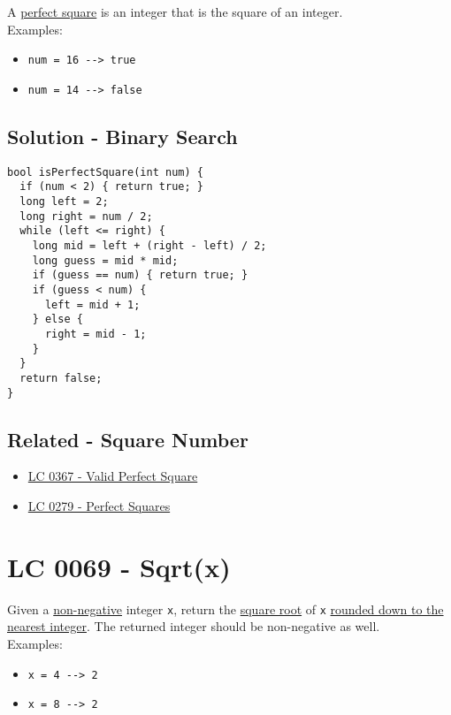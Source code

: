 A \ul{perfect square} is an integer that is the square of an integer.\\

Examples:
\begin{itemize}
\item {\colorbox{CodeBackground}{\lstinline|num = 16 --> true|}}
\item {\colorbox{CodeBackground}{\lstinline|num = 14 --> false|}}
\end{itemize}

\subsection*{Solution - Binary Search}
\begin{lstlisting}
bool isPerfectSquare(int num) {
  if (num < 2) { return true; }
  long left = 2;
  long right = num / 2;
  while (left <= right) {
    long mid = left + (right - left) / 2;
    long guess = mid * mid;
    if (guess == num) { return true; }
    if (guess < num) {
      left = mid + 1;
    } else {
      right = mid - 1;
    }
  }
  return false;
}
\end{lstlisting}

\subsection*{Related - Square Number}
\begin{itemize}
\item \hyperref[lc0367]{LC 0367 - Valid Perfect Square}
\item \hyperref[lc0279]{LC 0279 - Perfect Squares}
\end{itemize}

\section{LC 0069 - Sqrt(x)}
Given a \ul{non-negative} integer {\colorbox{CodeBackground}{\lstinline|x|}}, return the \ul{square root} of {\colorbox{CodeBackground}{\lstinline|x|}} \ul{rounded down to the nearest integer}. The returned integer should be non-negative as well.\\

Examples:
\begin{itemize}
\item {\colorbox{CodeBackground}{\lstinline|x = 4 --> 2|}}
\item {\colorbox{CodeBackground}{\lstinline|x = 8 --> 2|}}
\end{itemize}

